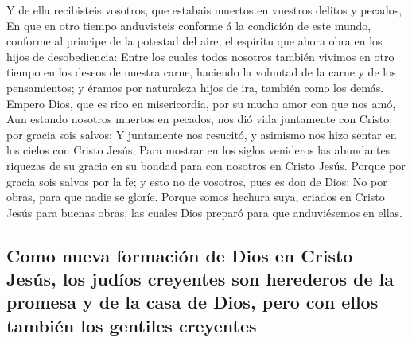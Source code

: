  Y de ella recibisteis vosotros, que estabais muertos en
vuestros delitos y pecados,  En que en otro tiempo
anduvisteis conforme á la condición de este mundo, conforme al príncipe
de la potestad del aire, el espíritu que ahora obra en los hijos de
desobediencia:  Entre los cuales todos nosotros también
vivimos en otro tiempo en los deseos de nuestra carne, haciendo la
voluntad de la carne y de los pensamientos; y éramos por naturaleza
hijos de ira, también como los demás.  Empero Dios, que es
rico en misericordia, por su mucho amor con que nos amó, 
Aun estando nosotros muertos en pecados, nos dió vida juntamente con
Cristo; por gracia sois salvos;  Y juntamente nos
resucitó, y asimismo nos hizo sentar en los cielos con Cristo Jesús,
 Para mostrar en los siglos venideros las abundantes
riquezas de su gracia en su bondad para con nosotros en Cristo Jesús.
 Porque por gracia sois salvos por la fe; y esto no de
vosotros, pues es don de Dios:  No por obras, para que
nadie se gloríe.  Porque somos hechura suya, criados en
Cristo Jesús para buenas obras, las cuales Dios preparó para que
anduviésemos en ellas.

\hypertarget{como-nueva-formaciuxf3n-de-dios-en-cristo-jesuxfas-los-juduxedos-creyentes-son-herederos-de-la-promesa-y-de-la-casa-de-dios-pero-con-ellos-tambiuxe9n-los-gentiles-creyentes}{%
\subsection{Como nueva formación de Dios en Cristo Jesús, los judíos
creyentes son herederos de la promesa y de la casa de Dios, pero con
ellos también los gentiles
creyentes}\label{como-nueva-formaciuxf3n-de-dios-en-cristo-jesuxfas-los-juduxedos-creyentes-son-herederos-de-la-promesa-y-de-la-casa-de-dios-pero-con-ellos-tambiuxe9n-los-gentiles-creyentes}}

